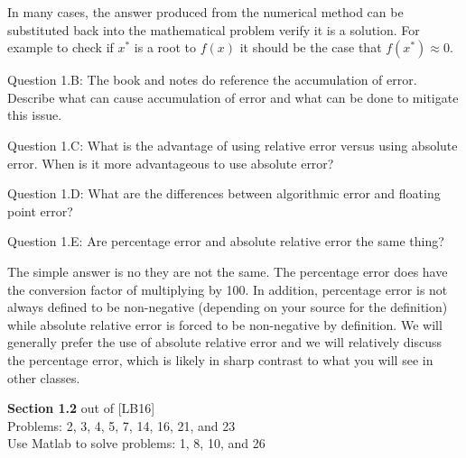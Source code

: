 \documentclass{article}
\renewcommand{\cite}[1]{[#1]}
\def\ds{\displaystyle}
\begin{document}
{\color{teal}In many cases, the answer produced from the numerical method can be substituted back into the mathematical problem verify it is a solution. For example to check if $\ds x^*$ is a root to $f(x)$ it should be the case that $\ds f(x^*)\approx 0$.}
 \medskip \par \noindent
%
Question 1.B: The book and notes  do reference the accumulation of error. Describe what can cause accumulation of error and what can be done to mitigate this issue. \medskip \par \noindent
%
Question 1.C: What is the advantage of using relative error versus using absolute error. When is it more advantageous to use absolute error?  \medskip \par \noindent
%
Question 1.D: What are the differences between algorithmic error and floating point error?  \medskip \par \noindent
Question 1.E: Are percentage error and absolute relative error the same thing? \medskip \par \noindent
{\color{teal}The simple answer is no they are not the same. The percentage error does have the conversion factor of multiplying by 100. In addition, percentage error is not always defined to be non-negative (depending on your source for the definition) while absolute relative error is forced to be non-negative by definition. We will generally prefer the use of absolute relative error and we will relatively discuss the percentage error, which is likely in sharp contrast to what you will see in other classes. }

\par \bigskip \par
{\bf Section 1.2} out of \cite{LB16} \\
Problems: 2, 3, 4, 5, 7, 14, 16, 21, and 23 \\
Use Matlab to solve problems: 1, 8, 10, and 26
\end{document}
